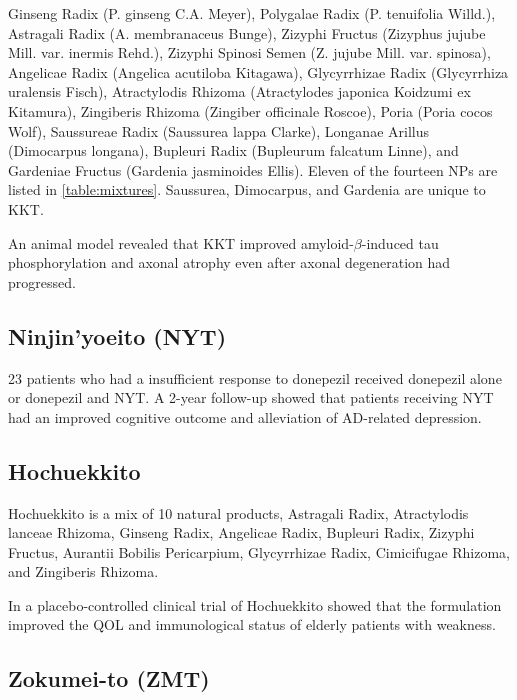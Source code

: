 \documentclass[twocolumn]{article}
\begin{document}
Ginseng Radix (P. ginseng C.A. Meyer),
Polygalae Radix (P. tenuifolia Willd.),
Astragali Radix (A. membranaceus Bunge),
Zizyphi Fructus (Zizyphus jujube Mill. var. inermis Rehd.),
Zizyphi Spinosi Semen (Z. jujube Mill. var. spinosa),
Angelicae Radix (Angelica acutiloba Kitagawa),
Glycyrrhizae Radix (Glycyrrhiza uralensis Fisch),
Atractylodis Rhizoma (Atractylodes japonica Koidzumi ex Kitamura),
Zingiberis Rhizoma (Zingiber officinale Roscoe),
Poria (Poria cocos Wolf),
Saussureae Radix (Saussurea lappa Clarke),
Longanae Arillus (Dimocarpus longana),
Bupleuri Radix (Bupleurum falcatum Linne), and
Gardeniae Fructus (Gardenia jasminoides Ellis).
Eleven of the fourteen NPs are listed in \ref{table:mixtures}.
Saussurea, Dimocarpus, and Gardenia are unique to KKT.

An animal model revealed that KKT
improved amyloid-$\beta$-induced tau phosphorylation and axonal atrophy
even after axonal degeneration had progressed.
\cite{watari2014new, watari2015comparing}



\subsection{Ninjin'yoeito (NYT)}


23 patients who had a insufficient response to donepezil
received donepezil alone or donepezil and NYT.
A 2-year follow-up showed that patients receiving NYT
had an improved cognitive outcome and alleviation of AD-related depression.
\cite{kudoh2015effect}





\subsection{Hochuekkito}
Hochuekkito is a mix of 10 natural products,
Astragali Radix,
Atractylodis lanceae Rhizoma,
Ginseng Radix,
Angelicae Radix,
Bupleuri Radix,
Zizyphi Fructus,
Aurantii Bobilis Pericarpium,
Glycyrrhizae Radix,
Cimicifugae Rhizoma,
and Zingiberis Rhizoma.
\cite{kiyohara2011polysaccharide}

In a placebo-controlled clinical trial of Hochuekkito
showed that the formulation improved the QOL and immunological status
of elderly patients with weakness.
\cite{satoh2005randomized}

\subsection{Zokumei-to (ZMT)}
\end{document}
